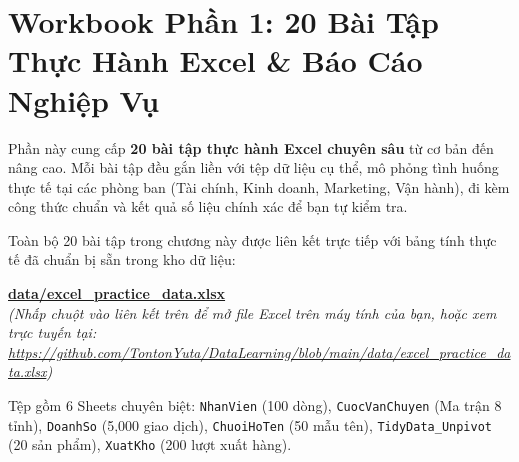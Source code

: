 \chapter{Workbook Phần 1: 20 Bài Tập Thực Hành Excel \& Báo Cáo Nghiệp Vụ}

\begin{lythuyetbox}
Phần này cung cấp \textbf{20 bài tập thực hành Excel chuyên sâu} từ cơ bản đến nâng cao. Mỗi bài tập đều gắn liền với tệp dữ liệu cụ thể, mô phỏng tình huống thực tế tại các phòng ban (Tài chính, Kinh doanh, Marketing, Vận hành), đi kèm công thức chuẩn và kết quả số liệu chính xác để bạn tự kiểm tra.
\end{lythuyetbox}

\begin{thuchanhbox}
Toàn bộ 20 bài tập trong chương này được liên kết trực tiếp với bảng tính thực tế đã chuẩn bị sẵn trong kho dữ liệu:
\begin{center}
\href{run:./data/excel_practice_data.xlsx}{\Large\textbf{\color{navyprimary}data/excel\_practice\_data.xlsx}} \\[0.2cm]
\small\textit{(Nhấp chuột vào liên kết trên để mở file Excel trên máy tính của bạn, hoặc xem trực tuyến tại: \url{https://github.com/TontonYuta/DataLearning/blob/main/data/excel_practice_data.xlsx})}
\end{center}
Tệp gồm 6 Sheets chuyên biệt: \texttt{NhanVien} (100 dòng), \texttt{CuocVanChuyen} (Ma trận 8 tỉnh), \texttt{DoanhSo} (5,000 giao dịch), \texttt{ChuoiHoTen} (50 mẫu tên), \texttt{TidyData\_Unpivot} (20 sản phẩm), \texttt{XuatKho} (200 lượt xuất hàng).
\end{thuchanhbox}

